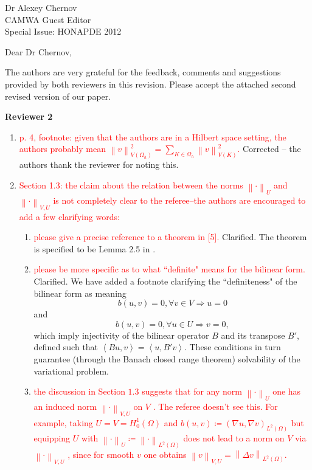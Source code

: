 \documentclass{letter}
\newcommand{\nor}[1]{\left\| #1 \right\|}
\newcommand{\LRp}[1]{\left( #1 \right)}
\newcommand{\LRa}[1]{\left\langle #1 \right\rangle}
\newcommand{\Oh}{\Omega_h}
\newcommand{\del}{\Delta}
\newcommand{\grad}{\nabla}
\begin{document}
\begin{letter}{Dr Alexey Chernov\\CAMWA Guest Editor\\Special Issue: HONAPDE 2012}


\opening{Dear Dr Chernov,}

The authors are very grateful for the feedback, comments and suggestions provided by both reviewers in this revision.  Please accept the attached second revised version of our paper. 

\textbf{Reviewer 2}

\begin{enumerate}
\item \textcolor{red}{p. 4, footnote: given that the authors are in a Hilbert space setting, the authors probably mean $\nor{v}_{V(\Oh)}^2 = \sum_{K\in \Oh} \nor{v}_{V(K)}^2$.}  Corrected -- the authors thank the reviewer for noting this.
\item \textcolor{red}{Section 1.3: the claim about the relation between the norms $\nor{\cdot}_U$ and $\nor{\cdot}_{V,U}$ is not completely clear to the referee--the authors are encouraged to add a few clarifying words:}
\begin{enumerate}
\item \textcolor{red}{please give a precise reference to a theorem in [5].} Clarified.  The theorem is specified to be Lemma 2.5 in \cite{Bui-ThanhDemkowiczGhattas11a}.  
\item \textcolor{red}{please be more specific as to what ``definite" means for the bilinear form.} Clarified.  We have added a footnote clarifying the ``definiteness" of the bilinear form as meaning 
\[
b(u,v) = 0, \forall v\in V \Rightarrow u = 0
\]
and
\[
b(u,v)=0, \forall u\in U \Rightarrow v = 0,
\]
 which imply injectivity of the bilinear operator $B$ and its transpose $B'$, defined such that $\LRa{Bu,v} = \LRa{u,B'v}.$  These conditions in turn guarantee (through the Banach closed range theorem) solvability of the variational problem.
\item \textcolor{red}{the discussion in Section $1.3$ suggests that for any norm $\nor{\cdot}_U$ one has an induced norm $\nor{\cdot}_{V,U}$ on $V$ . The referee doesn't see this. For example, taking $U = V = H_0^1(\Omega)$ and $b(u, v) \coloneqq \LRp{\grad u,\grad v}_{L^2(\Omega)}$ but equipping $U$ with $\nor{\cdot}_U \coloneqq \nor{\cdot}_{L^2(\Omega)}$ does not lead to a norm on $V$ via $\nor{\cdot}_{V,U}$ , since for smooth $v$ one obtains $\nor{v}_{V,U} = \nor{\del v}_{L^2(\Omega)}$.}  

\end{enumerate}
\end{enumerate}
\end{letter}
\end{document}

